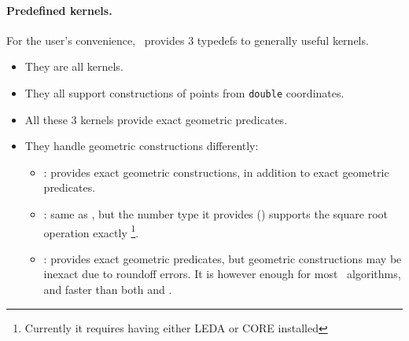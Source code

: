 \paragraph{Predefined kernels.}
For the user's convenience, \cgal\ provides 3 typedefs to generally useful
kernels.

\begin{itemize}
\item They are all  kernels.
\item They all support constructions of points from \texttt{double} 
      coordinates.
\item All these 3 kernels provide exact geometric predicates.
\item They handle geometric constructions differently:
  \begin{itemize}
  \item {}: provides exact
        geometric constructions, in addition to exact geometric predicates.
  \item {}:
        same as , but the
        number type it provides
        ()
        supports the square root operation exactly
        \footnote{Currently it requires having either LEDA or CORE installed}.
  \item {}: provides exact
        geometric predicates, but geometric constructions may be inexact due to
        roundoff errors.  It is however enough for most \cgal\ algorithms, and
        faster than both  and
        .
  \end{itemize}
\end{itemize}

